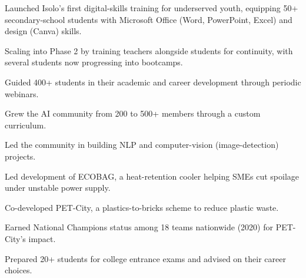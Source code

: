 
\begin{details}
    \item Launched Isolo's first digital-skills training for underserved youth, equipping 50+ secondary-school students with Microsoft Office (Word, PowerPoint, Excel) and design (Canva) skills.
    \item Scaling into Phase 2 by training teachers alongside students for continuity, with several students now progressing into bootcamps.
\end{details}

\begin{details}
    \item Guided 400+ students in their academic and career development through periodic webinars.
\end{details}

\begin{details}
    \item Grew the AI community from 200 to 500+ members through a custom curriculum.
    \item Led the community in building NLP and computer-vision (image-detection) projects.
\end{details}

\begin{details}
    \item Led development of ECOBAG, a heat-retention cooler helping SMEs cut spoilage under unstable power supply.
    \item Co-developed PET-City, a plastics-to-bricks scheme to reduce plastic waste.
    \item Earned National Champions status among 18 teams nationwide (2020) for PET-City's impact.
\end{details}

\begin{details}
    \item Prepared 20+ students for college entrance exams and advised on their career choices.
\end{details}

